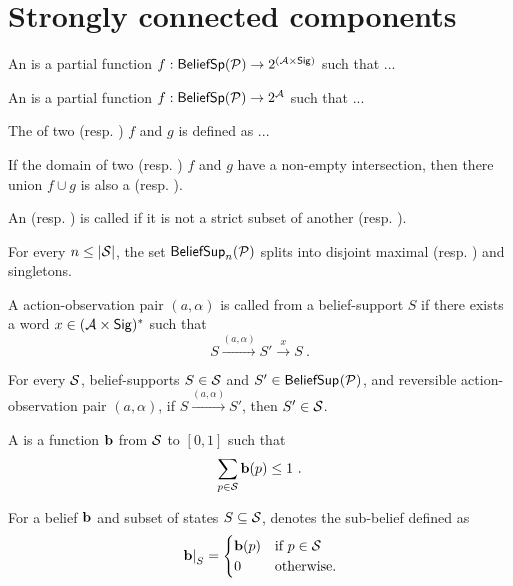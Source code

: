 %
\section{Strongly connected components}
%
\begin{definition}
%
An \emphdef{\aodscc} is a partial function $f : \bsp{\pdp} \to 2^{(\ac\times\sig)}$ such that ...
\end{definition}
%
\begin{definition}
%
An \emphdef{\adscc} is a partial function $f : \bsp{\pdp} \to 2^{\ac}$ such that ...
%
\end{definition}
%
\begin{definition}
The  of two \adscc (resp. \aodscc) $f$ and $g$ is defined as ...
\end{definition}
%
\begin{lemma}
If the domain of two \adscc{} (resp. \aodscc) $f$ and $g$ have a non-empty intersection,
then there union $f\cup g$ is also a \adscc{} (resp. \aodscc).
\end{lemma}
%
\begin{definition}
An \adscc{} (resp. \aodscc) is called  if it is not a strict subset of another \adscc{} (resp. \aodscc).
\end{definition}
%
\begin{corollary}
For every $n\leq |\st|$, the set $\bsup[n]{\pdp}$ splits into disjoint maximal \adscc{} (resp. \aodscc) and singletons.
\end{corollary}
%
\begin{definition}
A action-observation pair $(a,\alpha)$ is called  from a belief-support $S$ if there exists a word $x\in (\ac\times\sig)^*$ such that
\[
S \xrightarrow{(a,\alpha)} S' \xrightarrow{x} S \ .
\]
\end{definition}
%
\begin{lemma}
For every \aodscc{} $\cS$, belief-supports $S\in \cS$ and $S'\in \bsup{\pdp}$, and reversible action-observation pair $(a,\alpha)$,
if $S \xrightarrow{(a,\alpha)} S'$,
then $S' \in\cS$.
\end{lemma}
%
\begin{definition}
A  is a function $\bel{b}$ from $\st$ to $[0,1]$ such that
\[
\sum_{p\in\st} \bel{b}(p) \leq 1 \ .
\]
\end{definition}
%
\begin{notation}
For a belief $\bel{b}$ and subset of states $S\subseteq \st$,
 denotes the sub-belief defined as
\[
\res{\bel{b}}{S} =
\begin{cases}
\bel{b}(p) & \text{if $p\in\st$} \\
0 & \text{otherwise.}
\end{cases}
\]
\end{notation}
